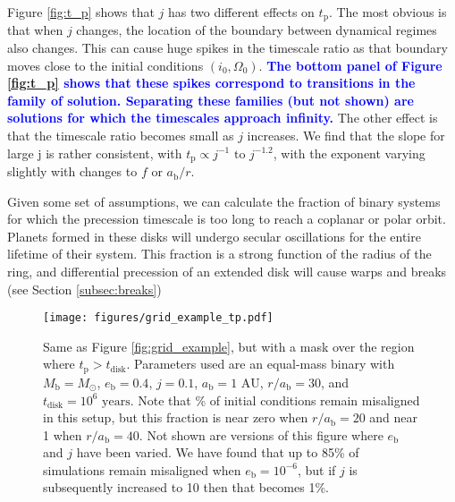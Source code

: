\documentclass[twocolumn,linenumbers]{aastex631}
\newcommand{\RR}[1]{\textcolor{blue}{\bf#1}} %
\begin{document}
Figure \ref{fig:t_p} shows that $j$ has two different effects on $t_\text{p}$. The most obvious is that when $j$ changes, the location of the boundary between dynamical regimes also changes. This can cause huge spikes in the timescale ratio as that boundary moves close to the initial conditions $(i_0, \Omega_0)$. \RR{The bottom panel of Figure \ref{fig:t_p} shows that these spikes correspond to transitions in the family of solution. Separating these families (but not shown) are solutions for which the timescales approach infinity.}
The other effect is that the timescale ratio becomes small as $j$ increases. We find that the slope for large j is rather consistent, with $t_\text{p}\propto j^{-1} \text{ to } j^{-1.2}$, with the exponent varying slightly with changes to $f$ or $a_\text{b}/r$. 

Given some set of assumptions, we can calculate the fraction of binary systems for which the precession timescale is too long to reach a coplanar or polar orbit. Planets formed in these disks will undergo secular oscillations for the entire lifetime of their system. This fraction is a strong function of the radius of the ring, and differential precession of an extended disk will cause warps and breaks (see Section \ref{subsec:breaks})

\begin{figure}
    \texttt{[image: figures/grid\_example\_tp.pdf]}
    \caption{Same as Figure \ref{fig:grid_example}, but with a mask over the region where $t_\text{p} > t_\text{disk}$. Parameters used are an equal-mass binary with $M_\text{b} = M_\odot$, $e_\text{b} = 0.4$, $j=0.1$, $a_\text{b} = 1\text{ AU}$, $r/a_\text{b} = 30$, and $t_\text{disk} = 10^6 \text{ years}$. Note that \% of initial conditions remain misaligned in this setup, but this fraction is near zero when $r/a_\text{b} = 20$ and near 1 when $r/a_\text{b} = 40$. Not shown are versions of this figure where $e_\text{b}$ and $j$ have been varied. We have found that up to 85\% of simulations remain misaligned when $e_\text{b}=10^{-6}$, but if $j$ is subsequently increased to 10 then that becomes 1\%. }
    \label{fig:grid-tp}
\end{figure}
\end{document}
